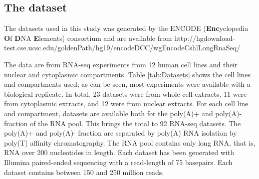 %









\subsection{The dataset}
The datasets used in this study was generated by the ENCODE
(\textbf{Enc}yclopedia \textbf{O}f \textbf{D}NA \textbf{E}lements) consortium
and are available from http://hgdownload-test.cse.ucsc.edu/goldenPath/hg19/encodeDCC/wgEncodeCshlLongRnaSeq/

The data are from RNA-seq experiments from 12 human cell lines and their
nuclear and cytoplasmic compartments. Table \ref{tab:Datasets} shows the cell
lines and compartments used; as can be seen, most experiments were available
with a biological replicate. In total, 23 datasets were from whole cell
extracts, 11 were from cytoplasmic extracts, and 12 were from nuclear extracts.
For each cell line and compartment, datasets are available both for the
poly(A)+ and poly(A)- fraction of the RNA pool. This brings the total to 92
RNA-seq datasets. The poly(A)+ and poly(A)- fraction are separated by poly(A)
RNA isolation by poly(T) affinity chromatography. The RNA pool contains only
long RNA, that is, RNA over 200 nucleotides in length. Each dataset has been
generated with Illumina paired-ended sequencing with a read-length of 75
basepairs. Each dataset contains between 150 and 250 million reads.

